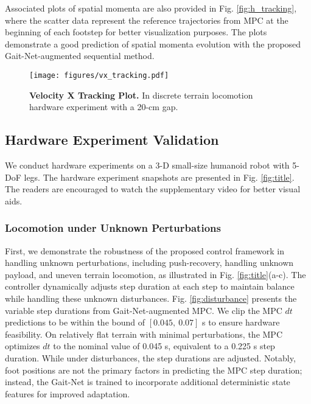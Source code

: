 Associated plots of spatial momenta are also provided in Fig. \ref{fig:h_tracking}, where the scatter data represent the reference trajectories from MPC at the beginning of each footstep for better visualization purposes. The plots demonstrate a good prediction of spatial momenta evolution with the proposed Gait-Net-augmented sequential method. 



\begin{figure}[!t]
\vspace{0.2cm}
    \center
    \texttt{[image: figures/vx\_tracking.pdf]}
    \caption{{\bfseries Velocity X Tracking Plot.} In discrete terrain locomotion hardware experiment with a 20-cm gap. }
    \label{fig:vx}
    \vspace{-0.2cm}
\end{figure}

\subsection{Hardware Experiment Validation}
We conduct hardware experiments on a 3-D small-size humanoid robot with 5-DoF legs. The hardware experiment snapshots are presented in Fig. \ref{fig:title}. The readers are encouraged to watch the supplementary video for better visual aids. 

\subsubsection{Locomotion under Unknown Perturbations}
First, we demonstrate the robustness of the proposed control framework in handling unknown perturbations, including push-recovery, handling unknown payload, and uneven terrain locomotion, as illustrated in Fig. \ref{fig:title}(a-c). The controller dynamically adjusts step duration at each step to maintain balance while handling these unknown disturbances. Fig. \ref{fig:disturbance} presents the variable step durations from Gait-Net-augmented MPC. We clip the MPC $dt$ predictions to be within the bound of $[0.045,\:0.07]$ s to ensure hardware feasibility. On relatively flat terrain with minimal perturbations, the MPC optimizes $dt$ to the nominal value of 0.045 s, equivalent to a 0.225 s step duration. While under disturbances, the step durations are adjusted. Notably, foot positions are not the primary factors in predicting the MPC step duration; instead, the Gait-Net is trained to incorporate additional deterministic state features for improved adaptation.

